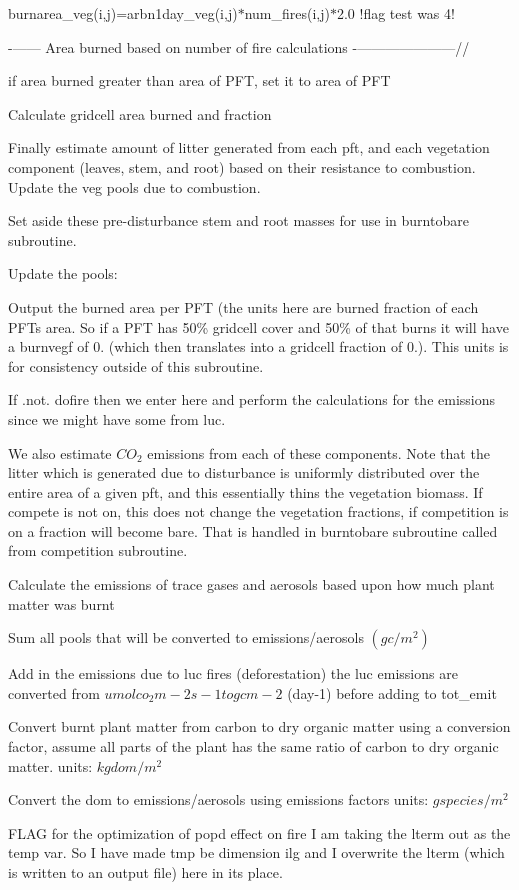 burnarea\+\_\+veg(i,j)=arbn1day\+\_\+veg(i,j)$\ast$num\+\_\+fires(i,j)$\ast$2.0 !flag test was 4!

-\/------ Area burned based on number of fire calculations -\/---------------------//

if area burned greater than area of P\+F\+T, set it to area of P\+F\+T

Calculate gridcell area burned and fraction

Finally estimate amount of litter generated from each pft, and each vegetation component (leaves, stem, and root) based on their resistance to combustion. Update the veg pools due to combustion.

Set aside these pre-\/disturbance stem and root masses for use in burntobare subroutine.

Update the pools\+:

Output the burned area per P\+F\+T (the units here are burned fraction of each P\+F\+Ts area. So if a P\+F\+T has 50\% gridcell cover and 50\% of that burns it will have a burnvegf of 0. (which then translates into a gridcell fraction of 0.). This units is for consistency outside of this subroutine.

If .not. dofire then we enter here and perform the calculations for the emissions since we might have some from luc.

We also estimate $CO_2$ emissions from each of these components. Note that the litter which is generated due to disturbance is uniformly distributed over the entire area of a given pft, and this essentially thins the vegetation biomass. If compete is not on, this does not change the vegetation fractions, if competition is on a fraction will become bare. That is handled in burntobare subroutine called from competition subroutine.

Calculate the emissions of trace gases and aerosols based upon how much plant matter was burnt

Sum all pools that will be converted to emissions/aerosols $(g c/m^2)$

Add in the emissions due to luc fires (deforestation) the luc emissions are converted from $umol co_2 m-2 s-1 to g c m-2$ (day-\/1) before adding to tot\+\_\+emit

Convert burnt plant matter from carbon to dry organic matter using a conversion factor, assume all parts of the plant has the same ratio of carbon to dry organic matter. units\+: $kg dom / m^2$

Convert the dom to emissions/aerosols using emissions factors units\+: $g species / m^2$

F\+L\+A\+G for the optimization of popd effect on fire I am taking the lterm out as the \textquotesingle{}temp\textquotesingle{} var. So I have made tmp be dimension ilg and I overwrite the lterm (which is written to an output file) here in its place. 